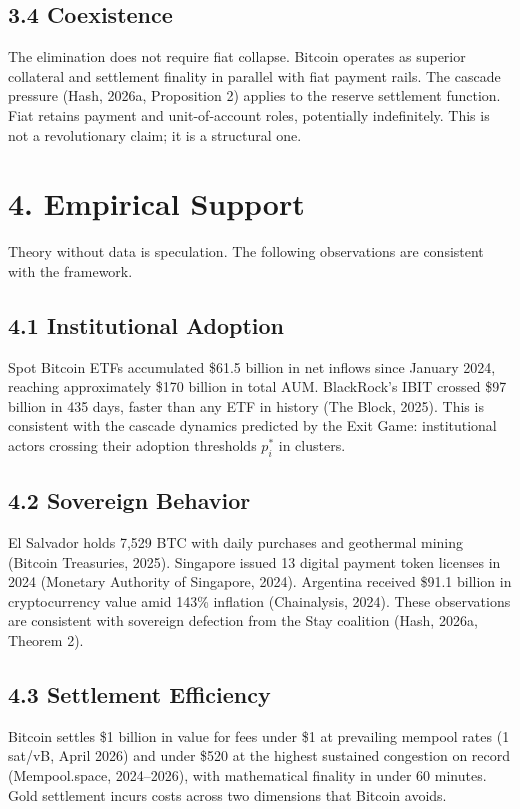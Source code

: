 \documentclass[12pt]{article}
\theoremstyle{definition}
\theoremstyle{remark}
\begin{document}
\subsection{3.4 Coexistence}

The elimination does not require fiat collapse. Bitcoin operates as
superior collateral and settlement finality in parallel with fiat
payment rails. The cascade pressure (Hash, 2026a, Proposition 2) applies
to the reserve settlement function. Fiat retains payment and
unit-of-account roles, potentially indefinitely. This is not a
revolutionary claim; it is a structural one.
\section{4. Empirical Support}

Theory without data is speculation. The following observations are
consistent with the framework.

\subsection{4.1 Institutional Adoption}

Spot Bitcoin ETFs accumulated \$61.5 billion in net inflows since
January 2024, reaching approximately \$170 billion in total AUM.
BlackRock's IBIT crossed \$97 billion in 435 days, faster than any ETF
in history (The Block, 2025). This is consistent with the cascade
dynamics predicted by the Exit Game: institutional actors crossing their
adoption thresholds $p_i^*$ in clusters.

\subsection{4.2 Sovereign Behavior}

El Salvador holds 7,529 BTC with daily purchases and geothermal mining
(Bitcoin Treasuries, 2025). Singapore issued 13 digital payment token
licenses in 2024 (Monetary Authority of Singapore, 2024). Argentina
received \$91.1 billion in cryptocurrency value amid 143\% inflation
(Chainalysis, 2024). These observations are consistent with sovereign
defection from the Stay coalition (Hash, 2026a, Theorem 2).

\subsection{4.3 Settlement Efficiency}

Bitcoin settles \$1 billion in value for fees under \$1 at prevailing
mempool rates (1 sat/vB, April 2026) and under \$520 at the highest
sustained congestion on record (Mempool.space, 2024--2026), with
mathematical finality in under 60 minutes. Gold settlement incurs costs
across two dimensions that Bitcoin avoids.
\end{document}
